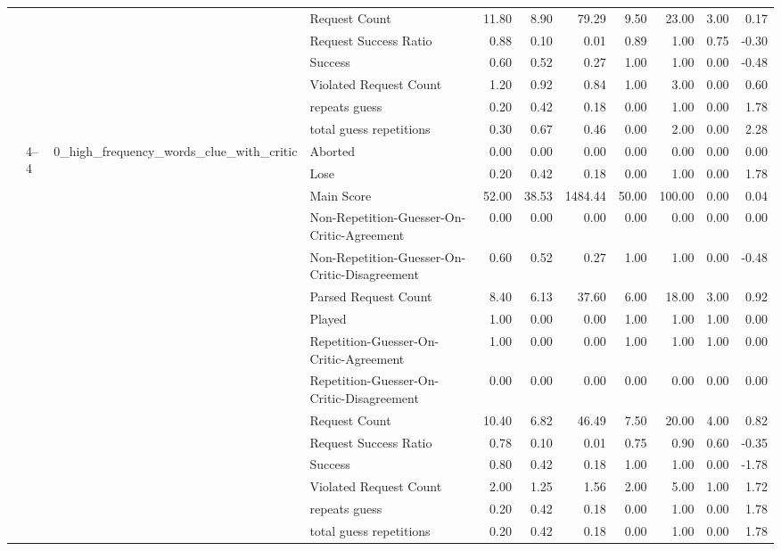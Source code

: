 \begin{tabular}{llllrrrrrrr}
 &  &  & Request Count & 11.80 & 8.90 & 79.29 & 9.50 & 23.00 & 3.00 & 0.17 \\
 &  &  & Request Success Ratio & 0.88 & 0.10 & 0.01 & 0.89 & 1.00 & 0.75 & -0.30 \\
 &  &  & Success & 0.60 & 0.52 & 0.27 & 1.00 & 1.00 & 0.00 & -0.48 \\
 &  &  & Violated Request Count & 1.20 & 0.92 & 0.84 & 1.00 & 3.00 & 0.00 & 0.60 \\
 &  &  & repeats guess & 0.20 & 0.42 & 0.18 & 0.00 & 1.00 & 0.00 & 1.78 \\
 &  &  & total guess repetitions & 0.30 & 0.67 & 0.46 & 0.00 & 2.00 & 0.00 & 2.28 \\
\cline{2-11} \cline{3-11}
 & \multirow[t]{45}{*}{4--4} & \multirow[t]{15}{*}{0_high_frequency_words_clue_with_critic} & Aborted & 0.00 & 0.00 & 0.00 & 0.00 & 0.00 & 0.00 & 0.00 \\
 &  &  & Lose & 0.20 & 0.42 & 0.18 & 0.00 & 1.00 & 0.00 & 1.78 \\
 &  &  & Main Score & 52.00 & 38.53 & 1484.44 & 50.00 & 100.00 & 0.00 & 0.04 \\
 &  &  & Non-Repetition-Guesser-On-Critic-Agreement & 0.00 & 0.00 & 0.00 & 0.00 & 0.00 & 0.00 & 0.00 \\
 &  &  & Non-Repetition-Guesser-On-Critic-Disagreement & 0.60 & 0.52 & 0.27 & 1.00 & 1.00 & 0.00 & -0.48 \\
 &  &  & Parsed Request Count & 8.40 & 6.13 & 37.60 & 6.00 & 18.00 & 3.00 & 0.92 \\
 &  &  & Played & 1.00 & 0.00 & 0.00 & 1.00 & 1.00 & 1.00 & 0.00 \\
 &  &  & Repetition-Guesser-On-Critic-Agreement & 1.00 & 0.00 & 0.00 & 1.00 & 1.00 & 1.00 & 0.00 \\
 &  &  & Repetition-Guesser-On-Critic-Disagreement & 0.00 & 0.00 & 0.00 & 0.00 & 0.00 & 0.00 & 0.00 \\
 &  &  & Request Count & 10.40 & 6.82 & 46.49 & 7.50 & 20.00 & 4.00 & 0.82 \\
 &  &  & Request Success Ratio & 0.78 & 0.10 & 0.01 & 0.75 & 0.90 & 0.60 & -0.35 \\
 &  &  & Success & 0.80 & 0.42 & 0.18 & 1.00 & 1.00 & 0.00 & -1.78 \\
 &  &  & Violated Request Count & 2.00 & 1.25 & 1.56 & 2.00 & 5.00 & 1.00 & 1.72 \\
 &  &  & repeats guess & 0.20 & 0.42 & 0.18 & 0.00 & 1.00 & 0.00 & 1.78 \\
 &  &  & total guess repetitions & 0.20 & 0.42 & 0.18 & 0.00 & 1.00 & 0.00 & 1.78 \\

\end{tabular}
